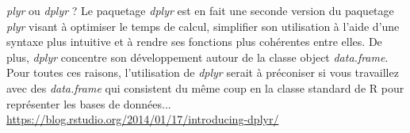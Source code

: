 \begin{moreInfo}{\emph{plyr} ou \emph{dplyr} ?}
	Le paquetage \emph{dplyr} est en fait une seconde version du paquetage \emph{plyr} visant à optimiser le temps de calcul, simplifier son utilisation à l'aide d'une syntaxe plus intuitive et à rendre ses fonctions plus cohérentes entre elles. De plus, \emph{dplyr} concentre son développement autour de la classe object \emph{data.frame}. Pour toutes ces raisons, l'utilisation de \emph{dplyr} serait à préconiser si vous travaillez avec des \emph{data.frame} qui consistent du même coup en la classe standard de R pour représenter les bases de données...\\
	\url{https://blog.rstudio.org/2014/01/17/introducing-dplyr/}
\end{moreInfo}